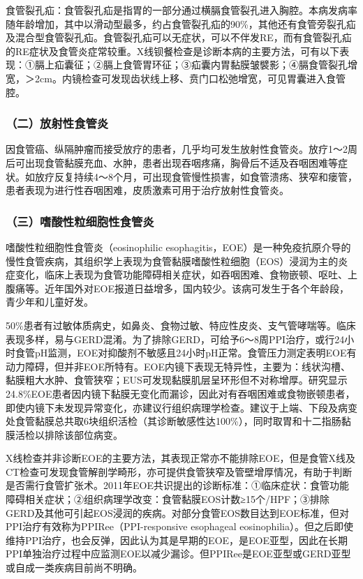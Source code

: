 食管裂孔疝：食管裂孔疝是指胃的一部分通过横膈食管裂孔进入胸腔。本病发病率随年龄增加，其中以滑动型最多，约占食管裂孔疝的90\%，其他还有食管旁裂孔疝及混合型食管裂孔疝。食管裂孔疝可以无症状，可以不伴发RE，而有食管裂孔疝的RE症状及食管炎症常较重。X线钡餐检查是诊断本病的主要方法，可有以下表现：①膈上疝囊征；②膈上食管胃环征；③疝囊内胃黏膜皱襞影；④膈食管裂孔增宽，＞2cm。内镜检查可发现齿状线上移、贲门口松弛增宽，可见胃囊进入食管腔。

\subsubsection{（二）放射性食管炎}

因食管癌、纵隔肿瘤而接受放疗的患者，几乎均可发生放射性食管炎。放疗1～2周后可出现食管黏膜充血、水肿，患者出现吞咽疼痛，胸骨后不适及吞咽困难等症状。如放疗反复持续4～8个月，可出现食管慢性损害，如食管溃疡、狭窄和瘘管，患者表现为进行性吞咽困难，皮质激素可用于治疗放射性食管炎。

\subsubsection{（三）嗜酸性粒细胞性食管炎}

嗜酸性粒细胞性食管炎（eosinophilic
esophagitis，EOE）是一种免疫抗原介导的慢性食管疾病，其组织学上表现为食管黏膜嗜酸性粒细胞（EOS）浸润为主的炎症变化，临床上表现为食管功能障碍相关症状，如吞咽困难、食物嵌顿、呕吐、上腹痛等。近年国外对EOE报道日益增多，国内较少。该病可发生于各个年龄段，青少年和儿童好发。

50\%患者有过敏体质病史，如鼻炎、食物过敏、特应性皮炎、支气管哮喘等。临床表现多样，易与GERD混淆。为了排除GERD，可给予6～8周PPI治疗，或行24小时食管pH监测，EOE对抑酸剂不敏感且24小时pH正常。食管压力测定表明EOE有动力障碍，但并非EOE所特有。EOE内镜下表现无特异性，主要为：线状沟槽、黏膜粗大水肿、食管狭窄；EUS可发现黏膜肌层呈环形但不对称增厚。研究显示24.8\%EOE患者因内镜下黏膜无变化而漏诊，因此对有吞咽困难或食物嵌顿患者，即使内镜下未发现异常变化，亦建议行组织病理学检查。建议于上端、下段及病变处食管黏膜总共取6块组织活检（其诊断敏感性达100\%），同时取胃和十二指肠黏膜活检以排除该部位病变。

X线检查并非诊断EOE的主要方法，其表现正常亦不能排除EOE，但是食管X线及CT检查可发现食管解剖学畸形，亦可提供食管狭窄及管壁增厚情况，有助于判断是否需行食管扩张术。2011年EOE共识提出的诊断标准：①临床症状：食管功能障碍相关症状；②组织病理学改变：食管黏膜EOS计数≥15个/HPF；③排除GERD及其他可引起EOS浸润的疾病。对部分食管EOS数目达到EOE标准，但对PPI治疗有效称为PPIRee（PPI-responsive
esophageal
eosinophilia）。但之后即使维持PPI治疗，也会反弹，因此认为其是早期的EOE，是EOE亚型，因此在长期PPI单独治疗过程中应监测EOE以减少漏诊。但PPIRee是EOE亚型或GERD亚型或自成一类疾病目前尚不明确。

